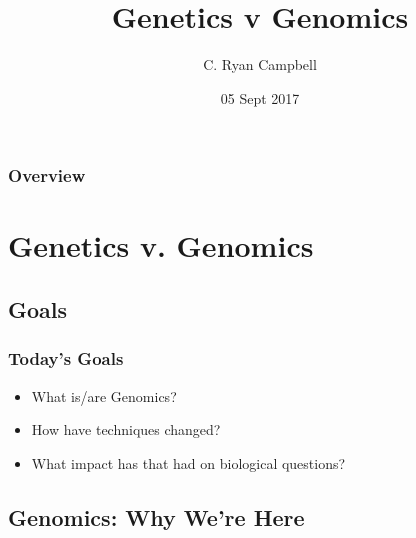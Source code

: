 \documentclass[14pt]{beamer}
\title[Genomics]{Genetics v Genomics} %
\author{C. Ryan Campbell} %
\institute[Duke] %
{
Duke University \\ %
\medskip
\textit{c.ryan.campbell@duke.edu} %
}
\date{05 Sept 2017} %
\begin{document}
\begin{frame}
\titlepage %
\end{frame}

\begin{frame}
\frametitle{Overview} %
\tableofcontents %
\end{frame}


\section{Genetics v. Genomics} 

\subsection{Goals} 

\begin{frame}
\frametitle{Today's Goals}
\begin{itemize}
	\item What is/are Genomics?
	\item How have techniques changed?
	\item What impact has that had on biological questions?
\end{itemize}
\end{frame}


\subsection{Genomics: Why We're Here}
\end{document}
